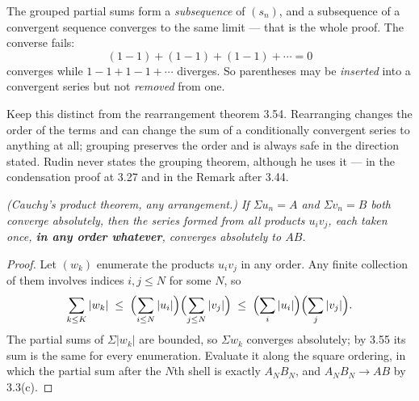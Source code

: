 \begin{pitfall}
The grouped partial sums form a \emph{subsequence} of $(s_n)$, and a
subsequence of a convergent sequence converges to the same limit --- that is
the whole proof. The converse fails:
\[ (1-1) + (1-1) + (1-1) + \cdots = 0 \]
converges while $1 - 1 + 1 - 1 + \cdots$ diverges. So parentheses may be
\emph{inserted} into a convergent series but not \emph{removed} from one.

Keep this distinct from the rearrangement theorem 3.54. Rearranging changes
the order of the terms and can change the sum of a conditionally convergent
series to anything at all; grouping preserves the order and is always safe in
the direction stated. Rudin never states the grouping theorem, although he
uses it --- in the condensation proof at 3.27 and in the Remark after 3.44.
\end{pitfall}

\emph{(Cauchy's product theorem, any arrangement.) If $\Sigma u_n = A$ and
$\Sigma v_n = B$ both converge absolutely, then the series formed from all
products $u_iv_j$, each taken once, \textbf{in any order whatever},
converges absolutely to $AB$.}
\begin{proof}
Let $(w_k)$ enumerate the products $u_iv_j$ in any order. Any finite
collection of them involves indices $i,j \le N$ for some $N$, so
\[ \sum_{k \le K} |w_k| \;\le\;
   \Bigl(\sum_{i\le N}|u_i|\Bigr)\Bigl(\sum_{j\le N}|v_j|\Bigr)
   \;\le\; \Bigl(\sum_i |u_i|\Bigr)\Bigl(\sum_j |v_j|\Bigr) . \]
The partial sums of $\Sigma|w_k|$ are bounded, so $\Sigma w_k$ converges
absolutely; by 3.55 its sum is the same for every enumeration. Evaluate it
along the square ordering, in which the partial sum after the $N$th shell is
exactly $A_NB_N$, and $A_NB_N \to AB$ by 3.3(c).
\end{proof}

